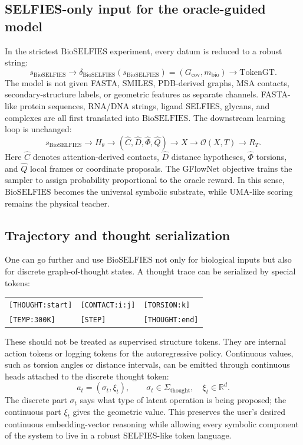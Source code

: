 \documentclass[11pt]{article}
\newcommand{\R}{\mathbb{R}}
\newcommand{\oracle}{\mathcal{O}}
\newcommand{\tokgt}{\mathrm{TokenGT}}
\newcommand{\bioselfies}{\mathrm{BioSELFIES}}
\begin{document}
\subsection{SELFIES-only input for the oracle-guided model}

In the strictest $\bioselfies$ experiment, every datum is reduced to a robust string:
\[
s_{\bioselfies}
\to
\delta_{\bioselfies}(s_{\bioselfies})
=
(G_{\mathrm{cov}},m_{\mathrm{bio}})
\to
\tokgt.
\]
The model is not given FASTA, SMILES, PDB-derived graphs, MSA contacts, secondary-structure labels, or geometric features as separate channels. FASTA-like protein sequences, RNA/DNA strings, ligand SELFIES, glycans, and complexes are all first translated into $\bioselfies$. The downstream learning loop is unchanged:
\[
s_{\bioselfies}
\to
H_\theta
\to
\left(\hat{C},\hat{D},\hat{\Phi},\hat{Q}\right)
\to
X
\to
\oracle(X,T)
\to
R_T.
\]
Here $\hat{C}$ denotes attention-derived contacts, $\hat{D}$ distance hypotheses, $\hat{\Phi}$ torsions, and $\hat{Q}$ local frames or coordinate proposals. The GFlowNet objective trains the sampler to assign probability proportional to the oracle reward. In this sense, $\bioselfies$ becomes the universal symbolic substrate, while UMA-like scoring remains the physical teacher.

\subsection{Trajectory and thought serialization}

One can go further and use $\bioselfies$ not only for biological inputs but also for discrete graph-of-thought states. A thought trace can be serialized by special tokens:
\begin{center}
\begin{tabular}{lll}
\texttt{[THOUGHT:start]} & \texttt{[CONTACT:i:j]} & \texttt{[TORSION:k]}\\
\texttt{[TEMP:300K]} & \texttt{[STEP]} & \texttt{[THOUGHT:end]}
\end{tabular}
\end{center}
These should not be treated as supervised structure tokens. They are internal action tokens or logging tokens for the autoregressive policy. Continuous values, such as torsion angles or distance intervals, can be emitted through continuous heads attached to the discrete thought token:
\[
a_t=(\sigma_t,\xi_t),\qquad
\sigma_t\in\Sigma_{\mathrm{thought}},\quad
\xi_t\in\R^d.
\]
The discrete part $\sigma_t$ says what type of latent operation is being proposed; the continuous part $\xi_t$ gives the geometric value. This preserves the user's desired continuous embedding-vector reasoning while allowing every symbolic component of the system to live in a robust SELFIES-like token language.
\end{document}
